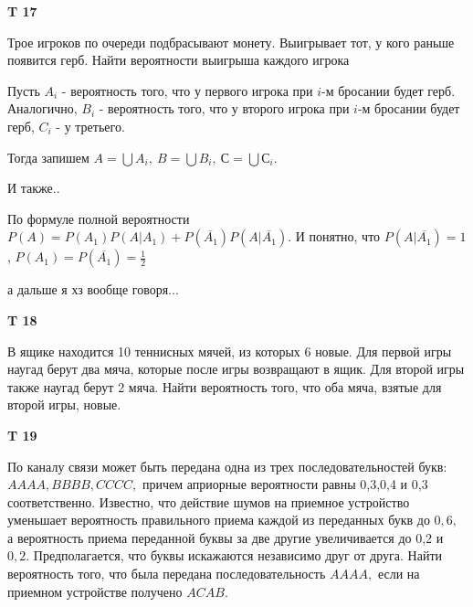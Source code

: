 \documentclass[a4paper,12pt]{article} %
\begin{document}
\begin{example}\textbf{T 17}

Трое игроков по очереди подбрасывают монету. 
Выигрывает тот, у кого раньше появится герб. 
Найти вероятности выигрыша каждого игрока

Пусть $A_i$ - вероятность того, что у первого игрока при $ i$-м бросании будет герб. 
Аналогично, $B_i$ - вероятность того, что у второго игрока при $ i$-м бросании будет герб, $ C_i$ - у третьего.

Тогда запишем $A=\bigcup A_i, \ B=\bigcup B_i, \ С=\bigcup С_i$.

И также..


По формуле полной вероятности $ P(A)= P(A_1) P(A|A_1)+ P(\overline{A_1}) P(A|\overline{A_1})$. И понятно, что $P(A|\overline{A_1})=1$, $P(A_1)=P(\overline{A_1})=\frac{1}{2}$

а дальше я хз вообще говоря...




\end{example}



\begin{example}\textbf{T 18}

В ящике находится 10 теннисных мячей, из которых 6 новые. 
Для первой игры наугад берут два мяча, которые после игры возвращают в ящик. 
Для второй игры также наугад берут 2 мяча. 
Найти вероятность того, что оба мяча, взятые для второй игры, новые.






\end{example}




\begin{example}\textbf{T 19}

По каналу связи может быть передана одна из трех последовательностей букв: $A A A A, B B B B, C C C C,$ причем априорные вероятности равны 0,3,0,4 и 0,3 соответственно. 
Известно, что действие шумов на приемное устройство уменьшает вероятность правильного приема каждой из переданных букв до $0,6,$ 
а вероятность приема переданной буквы за две другие увеличивается до 0,2 и $0,2 .$ 
Предполагается, что буквы искажаются независимо друг от друга. 
Найти вероятность того, что была передана последовательность $A A A A,$ если на приемном устройстве получено $A C A B$.






\end{example}
\end{document}
